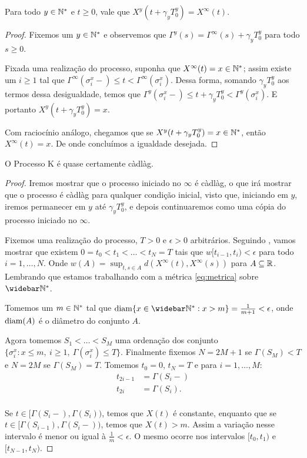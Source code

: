 \begin{proposicao}
  \label{prop:reinicia-infinito}
  Para todo $y \in {\mathbb{N^*}}$ e $t \geq 0$, vale que
  $X^y(t + \gamma_y T_0^y) = X^\infty(t)$.
\end{proposicao}
\begin{proof}
  Fixemos um $y \in {\mathbb{N^*}}$ e observemos que $\Gamma^y(s) =
  \Gamma^\infty(s) + \gamma_yT^y_0$ para todo $s \geq 0$.

  Fixada uma realização do processo, suponha que $X^\infty(t) = x \in
  {\mathbb{N^*}}$; assim existe um $i \geq 1$ tal que $\Gamma^\infty(\sigma_i^x-)
  \leq t < \Gamma^\infty(\sigma_i^x)$. Dessa forma, somando $\gamma_y
  T^y_0$ aos termos dessa desigualdade, temos que
  $\Gamma^y(\sigma_i^x-) \leq t+\gamma_yT_0^y <
  \Gamma^y(\sigma_i^x)$. E portanto $X^y(t+\gamma_y T_0^y) = x$.

  Com raciocínio análogo, chegamos que se $X^y(t+\gamma_y T_0^y) = x
  \in {\mathbb{N^*}}$, então $X^\infty(t) = x$. De onde concluímos a igualdade
  desejada.
\end{proof}


\begin{proposicao}
  \label{prop:proc-cadlag}
  O Processo K é quase certamente càdlàg.
\end{proposicao}
\begin{proof}

  Iremos mostrar que o processo iniciado no $\infty$ é càdlàg, o que
  irá mostrar que o processo é càdlàg para qualquer condição inicial,
  visto que, iniciando em $y$, iremos permanecer em $y$ até $\gamma_y
  T^y_0$, e depois continuaremos como uma cópia do processo iniciado
  no $\infty$.

  Fixemos uma realização do processo, $T > 0$ e $\epsilon > 0$
  arbitrários. Seguindo \cite{billingsley:99}, vamos mostrar que
  existem $0 = t_0 < t_1 < \ldots < t_N = T$ tais que $w[t_{i-1}, t_i)
  < \epsilon$ para todo $i = 1, \ldots, N$. Onde $w(A) = \sup_{t, s
    \in A} d(X^\infty(t), X^\infty(s))$ para $A \subseteq
  {\mathbb{R}}$. Lembrando que estamos trabalhando com a métrica
  \eqref{eq:metrica} sobre $\Nzb$.

  Tomemos um $m \in {\mathbb{N^*}}$ tal que $\diam\{x \in \Nzb: x > m \} =
  \frac{1}{m+1} < \epsilon$, onde ${\mathrm{diam}}(A)$ é o diâmetro do conjunto
  $A$.

  Agora tomemos $S_1 < \ldots < S_M$ uma ordenação dos conjunto $\{
  \sigma^x_i: x \leq m, \: i \geq 1, \: \Gamma(\sigma^x_i) \leq
  T\}$. Finalmente fixemos $N = 2M+1$ se $\Gamma(S_M) < T$ e $N = 2M$
  se $\Gamma(S_M) = T$. Tomemos $t_0 = 0$, $t_N = T$ e para $i=1,\ldots, M$:
  \begin{align*}
    t_{2i-1} &= \Gamma(S_i-)\\
    t_{2i} &= \Gamma(S_i).\\
  \end{align*}

  Se $t \in [\Gamma(S_i-), \Gamma(S_i))$, temos que $X(t)$ é
  constante, enquanto que se $t \in [\Gamma(S_{i-1}),
  \Gamma(S_{i}-))$, temos que $X(t) > m$. Assim a variação nesse
  intervalo é menor ou igual à $\frac{1}{m} < \epsilon$. O mesmo
  ocorre nos intervalos $[t_0, t_1)$ e $[t_{N-1}, t_N)$.
\end{proof}

